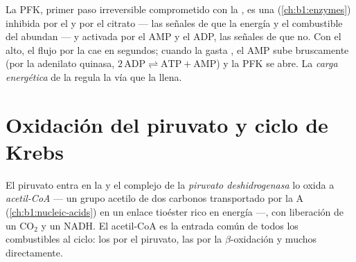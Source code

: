 \begin{proposition}\label{prop:b1:respiration-fermentation:pfk}
La PFK, primer paso irreversible comprometido con la , es una
 (\cref{ch:b1:enzymes}) inhibida por el  y por el
citrato --- las señales de que la energía y el combustible del  abundan --- y activada por el AMP y el ADP, las señales de que no. Con
el  alto, el flujo por la  cae en segundos; cuando la 
gasta , el AMP sube bruscamente (por la adenilato quinasa,
$2\,\mathrm{ADP} \rightleftharpoons \mathrm{ATP} + \mathrm{AMP}$) y la PFK
se abre. La \emph{carga energética} de la  regula la vía que la
llena.
\end{proposition}

\section{Oxidación del piruvato y ciclo de Krebs}

\begin{definition}\label{def:b1:respiration-fermentation:pdh}
El piruvato entra en la  y el complejo de la \emph{piruvato
deshidrogenasa} lo oxida a \emph{acetil-CoA} --- un grupo
acetilo de dos carbonos transportado por la  A
(\cref{ch:b1:nucleic-acids}) en un enlace tioéster rico en energía ---, con
liberación de un $\mathrm{CO_2}$ y un NADH. El acetil-CoA es la entrada
común de todos los combustibles al ciclo: los  por el piruvato, las
 por la $\beta$-oxidación y muchos  directamente.
\end{definition}


